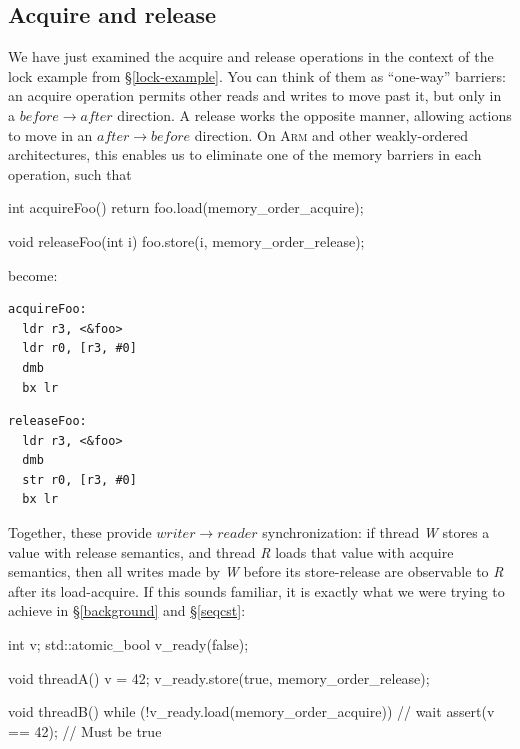 \documentclass[fontsize=10pt, oneside]{scrartcl}
\newcommand{\secref}[1]{\hyperref[#1]{\textsc{\S}\ref*{#1}}}
\begin{document}
\subsection{Acquire and release}

We have just examined the acquire and release operations in the context of the lock example from \secref{lock-example}.
You can think of them as ``one-way'' barriers: an acquire operation permits other reads and writes to move past it,
but only in a $before \to after$ direction.
A release works the opposite manner, allowing actions to move in an $after \to before$ direction.
On \textsc{Arm} and other weakly-ordered architectures, this enables us to eliminate one of the memory barriers in each operation,
such that

 \begin{cppcode}
int acquireFoo()
{
    return foo.load(memory_order_acquire);
}

void releaseFoo(int i)
{
    foo.store(i, memory_order_release);
}
\end{cppcode}
become:
\begin{minipage}{0.45\linewidth}
\begin{lstlisting}[language={[ARM]Assembler}]
acquireFoo:
  ldr r3, <&foo>
  ldr r0, [r3, #0]
  dmb
  bx lr
\end{lstlisting}
\end{minipage}
\begin{minipage}{0.45\linewidth}
\begin{lstlisting}[language={[ARM]Assembler}]
releaseFoo:
  ldr r3, <&foo>
  dmb
  str r0, [r3, #0]
  bx lr
\end{lstlisting}
\end{minipage}

Together, these provide $writer \to reader$ synchronization:
if thread \textit{W} stores a value with release semantics,
and thread \textit{R} loads that value with acquire semantics,
then all writes made by \textit{W} before its store-release are observable to \textit{R} after its load-acquire.
If this sounds familiar, it is exactly what we were trying to achieve in
\secref{background} and \secref{seqcst}:
\begin{cppcode}
int v;
std::atomic_bool v_ready(false);

void threadA()
{
    v = 42;
    v_ready.store(true, memory_order_release);
}

void threadB()
{
    while (!v_ready.load(memory_order_acquire)) {
        // wait
    }
    assert(v == 42); // Must be true
}
\end{cppcode}
\end{document}
